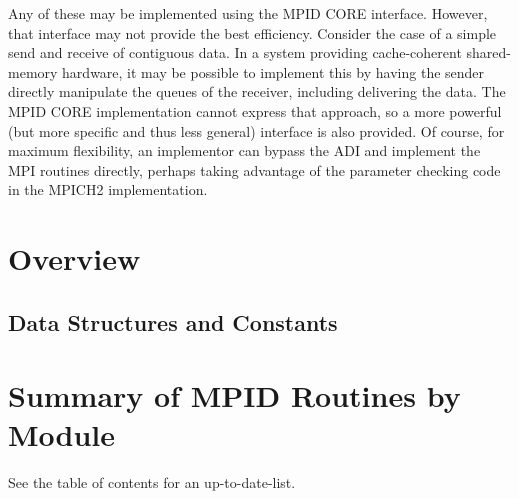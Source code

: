 \documentclass{article}
\begin{document}
Any of these may be implemented using the MPID CORE interface.
However, that interface may not provide the best efficiency.  Consider
the case of a simple send and receive of contiguous data.  In a system
providing cache-coherent shared-memory hardware, it may be possible to
implement this by having the sender directly manipulate the queues of
the receiver, including delivering the data.  The MPID CORE
implementation cannot express that approach, so a more powerful (but
more specific and thus less general) interface is also provided.  Of
course, for maximum flexibility, an implementor can bypass the ADI and
implement the MPI routines directly, perhaps taking advantage of the
parameter checking code in the MPICH2 implementation.

\mancontentstrue

\section{Overview}



\subsection{Data Structures and Constants}

%


\section{Summary of MPID Routines by Module}

See the table of contents for an up-to-date-list.

\end{document}

